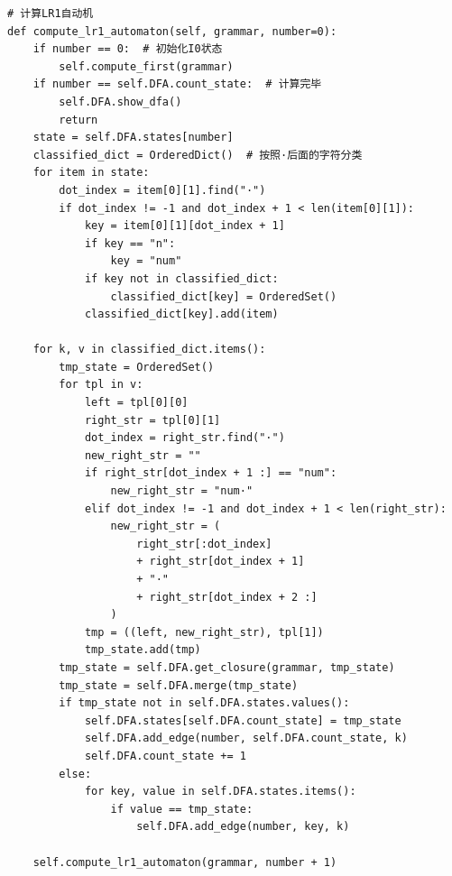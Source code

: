 \documentclass[lang=cn,11pt,a4paper]{elegantpaper}
\begin{document}
\begin{lstlisting}
# 计算LR1自动机
def compute_lr1_automaton(self, grammar, number=0):
    if number == 0:  # 初始化I0状态
        self.compute_first(grammar)
    if number == self.DFA.count_state:  # 计算完毕
        self.DFA.show_dfa()
        return
    state = self.DFA.states[number]
    classified_dict = OrderedDict()  # 按照·后面的字符分类
    for item in state:
        dot_index = item[0][1].find("·")
        if dot_index != -1 and dot_index + 1 < len(item[0][1]):
            key = item[0][1][dot_index + 1]
            if key == "n":
                key = "num"
            if key not in classified_dict:
                classified_dict[key] = OrderedSet()
            classified_dict[key].add(item)

    for k, v in classified_dict.items():
        tmp_state = OrderedSet()
        for tpl in v:
            left = tpl[0][0]
            right_str = tpl[0][1]
            dot_index = right_str.find("·")
            new_right_str = ""
            if right_str[dot_index + 1 :] == "num":
                new_right_str = "num·"
            elif dot_index != -1 and dot_index + 1 < len(right_str):
                new_right_str = (
                    right_str[:dot_index]
                    + right_str[dot_index + 1]
                    + "·"
                    + right_str[dot_index + 2 :]
                )
            tmp = ((left, new_right_str), tpl[1])
            tmp_state.add(tmp)
        tmp_state = self.DFA.get_closure(grammar, tmp_state)
        tmp_state = self.DFA.merge(tmp_state)
        if tmp_state not in self.DFA.states.values():
            self.DFA.states[self.DFA.count_state] = tmp_state
            self.DFA.add_edge(number, self.DFA.count_state, k)
            self.DFA.count_state += 1
        else:
            for key, value in self.DFA.states.items():
                if value == tmp_state:
                    self.DFA.add_edge(number, key, k)

    self.compute_lr1_automaton(grammar, number + 1)
\end{lstlisting}
\end{document}
